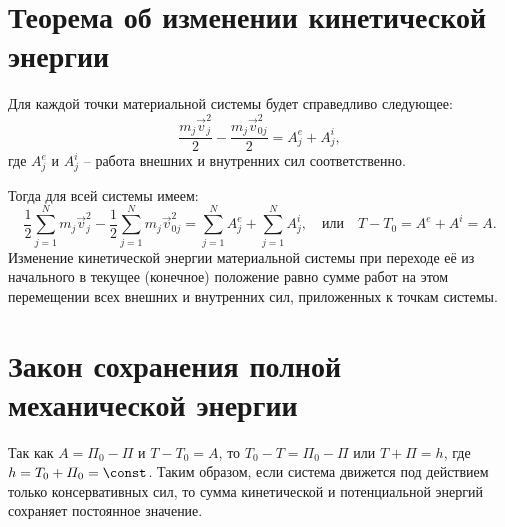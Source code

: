 \section{Теорема об изменении кинетической энергии}
Для каждой точки материальной системы будет справедливо следующее:
\[
    \frac{m_j\vec{v}_j^2}{2} - \frac{m_j\vec{v}_{0j}^2}{2} = A^e_j + A^i_j,
\]
где \( A^e_j \) и \( A^i_j \) -- работа внешних и внутренних сил соответственно.

Тогда для всей системы имеем:
\[
    \frac{1}{2}\sum_{j=1}^N m_j\vec{v}_j^2 -
    \frac{1}{2}\sum_{j=1}^N m_j\vec{v}_{0j}^2 =
    \sum_{j=1}^N A^e_j + \sum_{j=1}^N A^i_j, \quad \text{или} \quad
    T - T_0 = A^e + A^i = A.
\]
Изменение кинетической энергии материальной системы при переходе её из
начального в текущее (конечное) положение равно сумме работ на этом перемещении
всех внешних и внутренних сил, приложенных к точкам системы.

\section{Закон сохранения полной механической энергии}
Так как \( A = \varPi_0 - \varPi \) и \( T - T_0 = A \), то \( T_0 - T =
\varPi_0 - \varPi \) или \( T + \varPi = h \), где \( h = T_0 + \varPi_0 =
\const \).
Таким образом, если система движется под действием только консервативных сил, то
сумма кинетической и потенциальной энергий сохраняет постоянное значение.

\newpage
